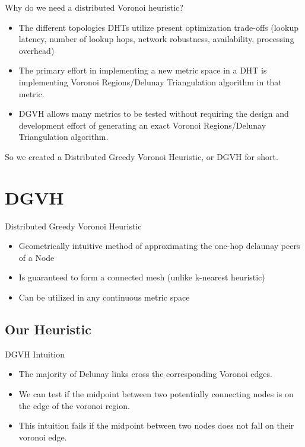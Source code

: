 \documentclass[8pt]{beamer}
\begin{document}
\begin{frame}{Why do we need a distributed Voronoi heuristic?}
	\begin{itemize}
		\item The different topologies DHTs utilize present optimization trade-offs (lookup latency, number of lookup hops, network robustness, availability, processing overhead)
		\item The primary effort in implementing a new metric space in a DHT is implementing Voronoi Regions/Delunay Triangulation algorithm in that metric.
		\item DGVH allows many metrics to be tested without requiring the design and development effort of generating an exact Voronoi Regions/Delunay Triangulation algorithm.
	\end{itemize}
	
	So we created a Distributed Greedy Voronoi Heuristic, or DGVH for short.
\end{frame}



	

	
\section{DGVH}
	\begin{frame}{Distributed Greedy Voronoi Heuristic}
		\begin{itemize}
			\item Geometrically intuitive method of approximating the one-hop delaunay peers of a Node
			\item Is guaranteed to form a connected mesh (unlike k-nearest heuristic)
			\item Can be utilized in any continuous metric space
		\end{itemize}
		
	\end{frame}
	
	\subsection{Our Heuristic}

	\begin{frame}{DGVH Intuition}

		\begin{itemize}
			\item The majority of Delunay links cross the corresponding Voronoi edges.
			\item We can test if the midpoint between two potentially connecting nodes is on the edge of the voronoi region.
			\item This intuition fails if the midpoint between two nodes does not fall on their voronoi edge.
		\end{itemize}

	\end{frame}
	
\end{document}
